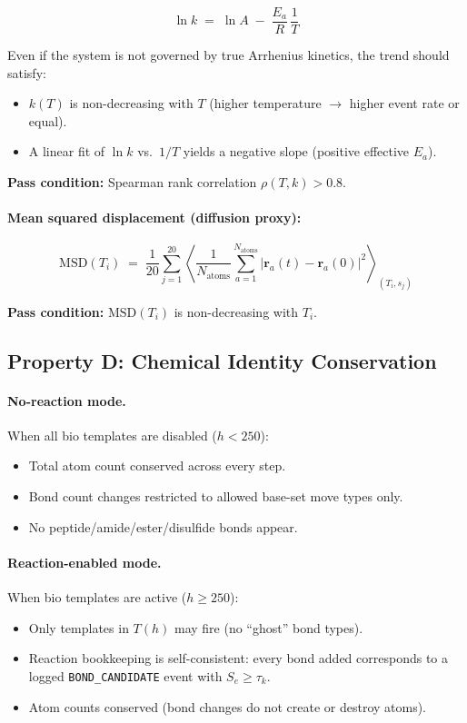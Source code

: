\documentclass[11pt]{article}
\begin{document}
\begin{equation}
\label{eq:arrhenius}
\ln k \;=\; \ln A \;-\; \frac{E_a}{R}\,\frac{1}{T}
\end{equation}

Even if the system is not governed by true Arrhenius kinetics, the
trend should satisfy:
\begin{itemize}
\item $k(T)$ is non-decreasing with $T$ (higher temperature $\to$ higher
      event rate or equal).
\item A linear fit of $\ln k$ vs.\ $1/T$ yields a negative slope
      (positive effective $E_a$).
\end{itemize}

\textbf{Pass condition:} Spearman rank correlation $\rho(T, k) > 0.8$.

\paragraph{Mean squared displacement (diffusion proxy):}

\begin{equation}
\mathrm{MSD}(T_i) \;=\;
\frac{1}{20}\sum_{j=1}^{20}
\left\langle \frac{1}{N_{\mathrm{atoms}}}
\sum_{a=1}^{N_{\mathrm{atoms}}}
|\mathbf{r}_a(t) - \mathbf{r}_a(0)|^2
\right\rangle_{(T_i, s_j)}
\end{equation}

\textbf{Pass condition:} $\mathrm{MSD}(T_i)$ is non-decreasing with $T_i$.

\subsection{Property D: Chemical Identity Conservation}

\paragraph{No-reaction mode.} When all bio templates are disabled ($h < 250$):
\begin{itemize}
\item Total atom count conserved across every step.
\item Bond count changes restricted to allowed base-set move types only.
\item No peptide/amide/ester/disulfide bonds appear.
\end{itemize}

\paragraph{Reaction-enabled mode.} When bio templates are active ($h \ge 250$):
\begin{itemize}
\item Only templates in $T(h)$ may fire (no ``ghost'' bond types).
\item Reaction bookkeeping is self-consistent: every bond added corresponds
      to a logged \texttt{BOND\_CANDIDATE} event with $S_e \ge \tau_k$.
\item Atom counts conserved (bond changes do not create or destroy atoms).
\end{itemize}
\end{document}

